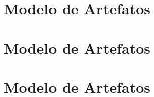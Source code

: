 \begin{apendicesenv}

\partapendices

\chapter{Modelo de Artefatos}


\chapter{Modelo de Artefatos}


\chapter{Modelo de Artefatos}


\end{apendicesenv}

